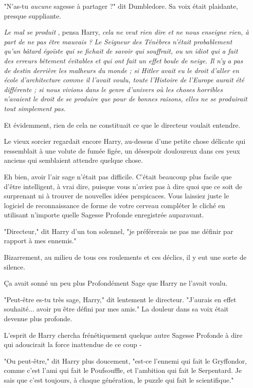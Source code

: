 "N'as-tu \emph{aucune}  sagesse à partager ?" dit Dumbledore. Sa voix était plaidante, presque suppliante.

\emph{Le mal se produit} , pensa Harry, \emph{cela ne veut rien dire et ne nous enseigne rien, à part de ne pas être mauvais ? Le Seigneur des Ténèbres n'était probablement qu'un bâtard égoïste qui se fichait de savoir qui souffrait, ou un idiot qui a fait des erreurs bêtement évitables et qui ont fait un effet boule de neige. Il n'y a pas de destin derrière les malheurs du monde ; si Hitler avait eu le droit d'aller en école d'architecture comme il l'avait voulu, toute l'Histoire de l'Europe aurait été différente ; si nous vivions dans le genre d'univers où les choses horribles n'avaient le droit de se produire que pour de bonnes raisons, elles ne se produirait tout simplement pas.} 

Et évidemment, rien de cela ne constituait ce que le directeur voulait entendre.

Le vieux sorcier regardait encore Harry, au-dessus d'une petite chose délicate qui ressemblait à une volute de fumée figée, un désespoir douloureux dans ces yeux anciens qui semblaient attendre quelque chose.

Eh bien, avoir l'air sage n'était pas difficile. C'était beaucoup plus facile que d'être intelligent, à vrai dire, puisque vous n'aviez pas à dire quoi que ce soit de surprenant ni à trouver de nouvelles idées perspicaces. Vous laissiez juste le logiciel de reconnaissance de forme de votre cerveau compléter le cliché en utilisant n'importe quelle Sagesse Profonde enregistrée auparavant.

"Directeur," dit Harry d'un ton solennel, "je préférerais ne pas me définir par rapport à mes ennemis."

Bizarrement, au milieu de tous ces roulements et ces déclics, il y eut une sorte de silence.

Ça avait sonné un peu plus Profondément Sage que Harry ne l'avait voulu.

"Peut-être es-tu très sage, Harry," dit lentement le directeur. "J'aurais en effet souhaité... avoir pu être défini par mes amis." La douleur dans sa voix était devenue plus profonde.

L'esprit de Harry chercha frénétiquement quelque autre Sagesse Profonde à dire qui adoucirait la force inattendue de ce coup -

"Ou peut-être," dit Harry plus doucement, "est-ce l'ennemi qui fait le Gryffondor, comme c'est l'ami qui fait le Poufsouffle, et l'ambition qui fait le Serpentard. Je sais que c'est toujours, à chaque génération, le puzzle qui fait le scientifique."

